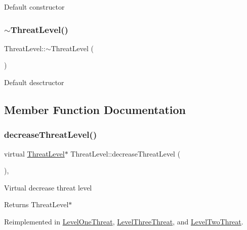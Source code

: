 Default constructor \mbox{\label{classThreatLevel_ad69b03a01e63cffeca7656155d4e0849}} 
\subsubsection{\texorpdfstring{$\sim$\+Threat\+Level()}{~ThreatLevel()}}
{\footnotesize\ttfamily Threat\+Level\+::$\sim$\+Threat\+Level (\begin{DoxyParamCaption}{ }\end{DoxyParamCaption})\hspace{0.3cm}{\ttfamily [inline]}}

Default desctructor 

\subsection{Member Function Documentation}
\mbox{\label{classThreatLevel_a3545ec161fbe4c01beafb9b43624c7e8}} 
\subsubsection{\texorpdfstring{decrease\+Threat\+Level()}{decreaseThreatLevel()}}
{\footnotesize\ttfamily virtual \hyperlink{classThreatLevel}{Threat\+Level}$\ast$ Threat\+Level\+::decrease\+Threat\+Level (\begin{DoxyParamCaption}{ }\end{DoxyParamCaption})\hspace{0.3cm}{\ttfamily [inline]}, {\ttfamily [virtual]}}

Virtual decrease threat level \begin{DoxyReturn}{Returns}
Threat\+Level$\ast$ 
\end{DoxyReturn}


Reimplemented in \hyperlink{classLevelOneThreat_a9a2899ac02e075905671ea03374cd561}{Level\+One\+Threat}, \hyperlink{classLevelThreeThreat_a98337ab08fe61b136d9c9e48f7ace804}{Level\+Three\+Threat}, and \hyperlink{classLevelTwoThreat_a1d9e88b0f43396721a2f51ae67191359}{Level\+Two\+Threat}.

